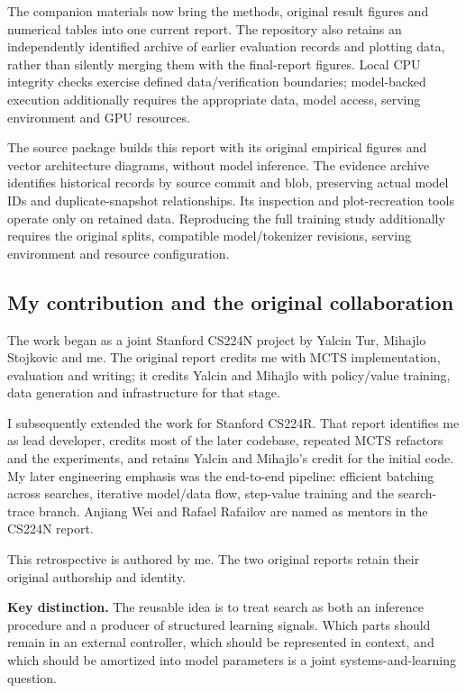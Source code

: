 \documentclass[11pt,letterpaper]{article}
\newcommand{\takeaway}[1]{\par\smallskip\noindent\colorbox{pale}{\parbox{\dimexpr\linewidth-2\fboxsep\relax}{\small\textbf{Key distinction.} #1}}\par\smallskip}
\begin{document}
The companion materials now bring the methods, original result figures and numerical tables into one current report. The repository also retains an independently identified archive of earlier evaluation records and plotting data, rather than silently merging them with the final-report figures. Local CPU integrity checks exercise defined data/verification boundaries; model-backed execution additionally requires the appropriate data, model access, serving environment and GPU resources.

The source package builds this report with its original empirical figures and vector architecture diagrams, without model inference. The evidence archive identifies historical records by source commit and blob, preserving actual model IDs and duplicate-snapshot relationships. Its inspection and plot-recreation tools operate only on retained data. Reproducing the full training study additionally requires the original splits, compatible model/tokenizer revisions, serving environment and resource configuration.

\subsection{My contribution and the original collaboration}
The work began as a joint Stanford CS224N project by Yalcin Tur, Mihajlo Stojkovic and me. The original report credits me with MCTS implementation, evaluation and writing; it credits Yalcin and Mihajlo with policy/value training, data generation and infrastructure for that stage.

I subsequently extended the work for Stanford CS224R. That report identifies me as lead developer, credits most of the later codebase, repeated MCTS refactors and the experiments, and retains Yalcin and Mihajlo's credit for the initial code. My later engineering emphasis was the end-to-end pipeline: efficient batching across searches, iterative model/data flow, step-value training and the search-trace branch. Anjiang Wei and Rafael Rafailov are named as mentors in the CS224N report.

This retrospective is authored by me. The two original reports retain their original authorship and identity.

\takeaway{The reusable idea is to treat search as both an inference procedure and a producer of structured learning signals. Which parts should remain in an external controller, which should be represented in context, and which should be amortized into model parameters is a joint systems-and-learning question.}
\end{document}
